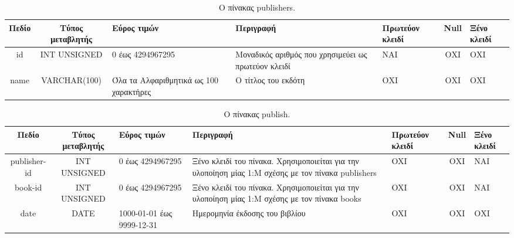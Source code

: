 \documentclass{assignment}
\begin{document}
\begin{landscape}
\begin{table}[htbp]
\begin{center}
  \begin{tabular}{|c|c|m{}|m{}|m{2.0cm}|c|m{1.5cm}|}
    \hline
    {\bf Πεδίο} & {\bf Τύπος μεταβλητής} & {\bf Εύρος τιμών} & {\bf Περιγραφή} & {\bf Πρωτεύον κλειδί} & {\bf Null} & {\bf Ξένο κλειδί} \\ \hline
    id & INT UNSIGNED & 0 έως 4294967295 & Μοναδικός αριθμός που χρησιμεύει ως πρωτεύον κλειδί & ΝΑΙ & ΟΧΙ & ΟΧΙ \\ \hline
    name & VARCHAR(100) & Όλα τα Αλφαριθμητικά ως 100 χαρακτήρες & Ο τίτλος του εκδότη & ΟΧΙ & ΟΧΙ & ΟΧΙ \\ \hline
  \end{tabular}
\caption{Ο πίνακας publishers.}
\label{table:db_table:publishers}
\end{center}
\end{table}

\begin{table}[htbp]
\begin{center}
  \begin{tabular}{|c|c|m{}|m{}|m{2.0cm}|c|m{1.5cm}|}
    \hline
    {\bf Πεδίο} & {\bf Τύπος μεταβλητής} & {\bf Εύρος τιμών} & {\bf Περιγραφή} & {\bf Πρωτεύον κλειδί} & {\bf Null} & {\bf Ξένο κλειδί} \\ \hline
    publisher-id & INT UNSIGNED & 0 έως 4294967295 & Ξένο κλειδί του πίνακα. Χρησιμοποιείται για την υλοποίηση μίας 1:Μ σχέσης με τον πίνακα publishers & OXI & ΟΧΙ & NAI \\ \hline
    book-id & INT UNSIGNED & 0 έως 4294967295 & Ξένο κλειδί του πίνακα. Χρησιμοποιείται για την υλοποίηση μίας 1:Μ σχέσης με τον πίνακα books & OXI & ΟΧΙ & NAI \\ \hline
    date & DATE & 1000-01-01 έως 9999-12-31 & Ημερομηνία έκδοσης του βιβλίου & OXI & ΟΧΙ & ΟΧΙ \\ \hline
  \end{tabular}
\caption{Ο πίνακας publish.}
\label{table:db_table:publish}
\end{center}
\end{table}
\end{landscape}
\end{document}

